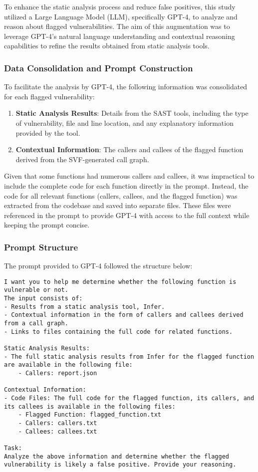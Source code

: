 To enhance the static analysis process and reduce false positives, this study utilized a Large Language Model (LLM), specifically GPT-4, to analyze and reason about flagged vulnerabilities. The aim of this augmentation was to leverage GPT-4’s natural language understanding and contextual reasoning capabilities to refine the results obtained from static analysis tools.

\subsubsection{Data Consolidation and Prompt Construction}
To facilitate the analysis by GPT-4, the following information was consolidated for each flagged vulnerability:
\begin{enumerate}
    \item \textbf{Static Analysis Results}: Details from the SAST tools, including the type of vulnerability, file and line location, and any explanatory information provided by the tool.
    \item \textbf{Contextual Information}: The callers and callees of the flagged function derived from the SVF-generated call graph.
\end{enumerate}

Given that some functions had numerous callers and callees, it was impractical to include the complete code for each function directly in the prompt. Instead, the code for all relevant functions (callers, callees, and the flagged function) was extracted from the codebase and saved into separate files. These files were referenced in the prompt to provide GPT-4 with access to the full context while keeping the prompt concise.

\subsubsection{Prompt Structure}
The prompt provided to GPT-4 followed the structure below:

\begin{lstlisting}[breaklines=true, caption={Prompt structure for GPT-4 analysis of flagged vulnerabilities.}, label={prompt}]
I want you to help me determine whether the following function is vulnerable or not.
The input consists of:
- Results from a static analysis tool, Infer.
- Contextual information in the form of callers and callees derived from a call graph.
- Links to files containing the full code for related functions.

Static Analysis Results:
- The full static analysis results from Infer for the flagged function are available in the following file:
    - Callers: report.json

Contextual Information:
- Code Files: The full code for the flagged function, its callers, and its callees is available in the following files:
    - Flagged Function: flagged_function.txt
    - Callers: callers.txt
    - Callees: callees.txt

Task:
Analyze the above information and determine whether the flagged vulnerability is likely a false positive. Provide your reasoning.
\end{lstlisting}


